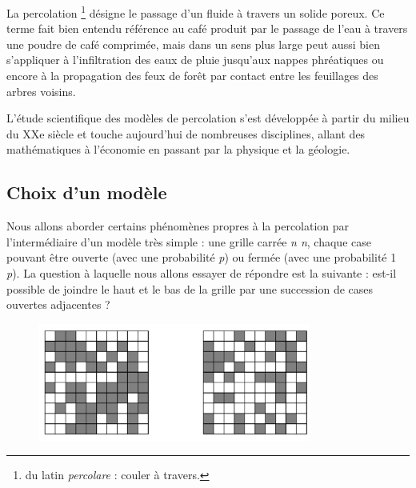 
La percolation \footnote{du latin \emph{percolare} : couler à travers.} désigne le passage d'un fluide à
travers un solide poreux. Ce terme fait bien entendu référence au café
produit par le passage de l'eau à travers une poudre de café comprimée,
mais dans un sens plus large peut aussi bien s'appliquer à
l'infiltration des eaux de pluie jusqu'aux nappes phréatiques ou encore
à la propagation des feux de forêt par contact entre les feuillages des
arbres voisins.

L'étude scientifique des modèles de percolation s'est développée à
partir du milieu du XXe siècle et touche aujourd'hui de nombreuses
disciplines, allant des mathématiques à l'économie en passant par la
physique et la géologie.


\subsection{Choix d'un modèle}\label{choix-dun-moduxe8le}


Nous allons aborder certains phénomènes propres à la percolation par
l'intermédiaire d'un modèle très simple : une grille carrée \emph{n n},
chaque case pouvant être ouverte (avec une probabilité \emph{p}) ou
fermée (avec une probabilité 1 \emph{p}). La question à laquelle nous
allons essayer de répondre est la suivante : est-il possible de joindre
le haut et le bas de la grille par une succession de cases ouvertes
adjacentes ?
\begin{figure}[!htb]
\begin{center}
\includegraphics[width=0.8\textwidth]{illustration_perco.jpg}
\end{center}
\end{figure}


